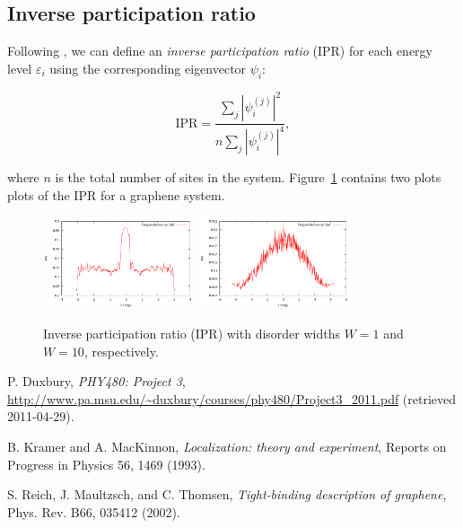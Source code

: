 \documentclass{revtex4}
\begin{document}
\subsection{Inverse participation ratio}

Following \cite{kramer1993}, we can define an \emph{inverse participation ratio} (IPR) for each energy level $\varepsilon_i$ using the corresponding eigenvector $\psi_i$:

\[
\text{IPR} = \frac{\sum_j |\psi_i^{(j)}|^2}{n \sum_j |\psi_i^{(j)}|^4},
\]

where $n$ is the total number of sites in the system. Figure~\ref{fig:anderson-ipr} contains two plots plots of the IPR for a graphene system.

\begin{figure}[h!]
\includegraphics[width=0.4\textwidth]{anderson-ipr-W1.png}
\includegraphics[width=0.4\textwidth]{anderson-ipr-W10.png}
\caption{Inverse participation ratio (IPR) with disorder widths $W=1$ and $W=10$, respectively.}
\label{fig:anderson-ipr}
\end{figure}


\begin{thebibliography}{9}

	P. Duxbury,
	\emph{PHY480: Project 3},
	\url{http://www.pa.msu.edu/~duxbury/courses/phy480/Project3_2011.pdf}
	(retrieved 2011-04-29).

	B. Kramer and A. MacKinnon,
	\emph{Localization: theory and experiment},
	Reports on Progress in Physics 56, 1469 (1993).

	S. Reich, J. Maultzsch, and C. Thomsen,
	\emph{Tight-binding description of graphene},
	Phys. Rev. B66, 035412 (2002).

\end{thebibliography}
\end{document}
